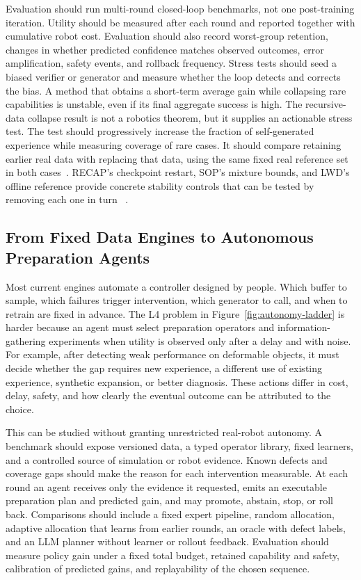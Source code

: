 Evaluation should run multi-round closed-loop benchmarks, not one post-training iteration.
Utility should be measured after each round and reported together with cumulative robot cost.
Evaluation should also record worst-group retention, changes in whether predicted confidence matches observed outcomes, error amplification, safety events, and rollback frequency.
Stress tests should seed a biased verifier or generator and measure whether the loop detects and corrects the bias.
A method that obtains a short-term average gain while collapsing rare capabilities is unstable, even if its final aggregate success is high.
The recursive-data collapse result is not a robotics theorem, but it supplies an actionable stress test.
The test should progressively increase the fraction of self-generated experience while measuring coverage of rare cases.
It should compare retaining earlier real data with replacing that data, using the same fixed real reference set in both cases~\cite{shumailov2024collapse}.
RECAP's checkpoint restart, SOP's mixture bounds, and LWD's offline reference provide concrete stability controls that can be tested by removing each one in turn ~\cite{intelligence20250_2511_14759,pan2026sop_2601_03044,wang2026learning_2605_00416}.

\subsection{From Fixed Data Engines to Autonomous Preparation Agents}

Most current engines automate a controller designed by people.
Which buffer to sample, which failures trigger intervention, which generator to call, and when to retrain are fixed in advance.
The L4 problem in Figure~\ref{fig:autonomy-ladder} is harder because an agent must select preparation operators and information-gathering experiments when utility is observed only after a delay and with noise.
For example, after detecting weak performance on deformable objects, it must decide whether the gap requires new experience, a different use of existing experience, synthetic expansion, or better diagnosis.
These actions differ in cost, delay, safety, and how clearly the eventual outcome can be attributed to the choice.

This can be studied without granting unrestricted real-robot autonomy.
A benchmark should expose versioned data, a typed operator library, fixed learners, and a controlled source of simulation or robot evidence.
Known defects and coverage gaps should make the reason for each intervention measurable.
At each round an agent receives only the evidence it requested, emits an executable preparation plan and predicted gain, and may promote, abstain, stop, or roll back.
Comparisons should include a fixed expert pipeline, random allocation, adaptive allocation that learns from earlier rounds, an oracle with defect labels, and an LLM planner without learner or rollout feedback.
Evaluation should measure policy gain under a fixed total budget, retained capability and safety, calibration of predicted gains, and replayability of the chosen sequence.

